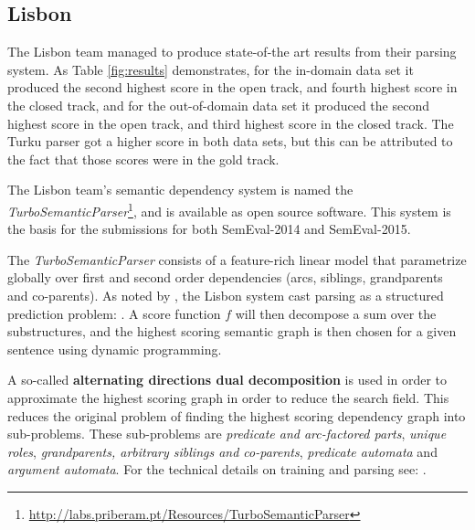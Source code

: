 \subsection{Lisbon} 

The Lisbon team managed to produce state-of-the art results from their parsing system. As Table \ref{fig:results} demonstrates, for the in-domain data set it produced the second highest score in the open track, and fourth highest score in the closed track, and for the out-of-domain data set it produced the second highest score in the open track, and third highest score in the closed track. The Turku parser got a higher score in both data sets, but this can be attributed to the fact that those scores were in the gold track.

The Lisbon team's semantic dependency system is named the \textit{TurboSemanticParser}\footnote{\url{http://labs.priberam.pt/Resources/TurboSemanticParser}}, and is available as open source software. This system is the basis for the submissions for both SemEval-2014 and SemEval-2015. 

The \textit{TurboSemanticParser} consists of a feature-rich linear model that parametrize globally over first and second order dependencies (arcs, siblings, grandparents and co-parents). As noted by , the Lisbon system cast parsing as a structured prediction problem: . A score function $f$ will then decompose a sum over the substructures, and the highest scoring semantic graph is then chosen for a given sentence using dynamic programming.

A so-called \textbf{alternating directions dual decomposition} is used in order to approximate the highest scoring graph in order to reduce the search field. This reduces the original problem of finding the highest scoring dependency graph into sub-problems. These sub-problems are \textit{predicate and arc-factored parts}, \textit{unique roles}, \textit{grandparents, arbitrary siblings and co-parents}, \textit{predicate automata} and \textit{argument automata}. For the technical details on training and parsing see: .


